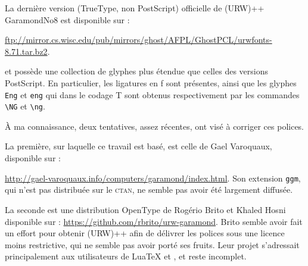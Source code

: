 \documentclass[12pt,english,french]{article}
\begin{document}
%
%

La dernière version (TrueType, non PostScript) officielle de (URW)++ GaramondNo8 est disponible sur :

\noindent\url{ftp://mirror.cs.wisc.edu/pub/mirrors/ghost/AFPL/GhostPCL/urwfonts-8.71.tar.bz2}.

\noindent et possède une collection de glyphes plus étendue que celles des versions PostScript. En particulier, les ligatures en f sont présentes, ainsi que les glyphes \texttt{Eng} et \texttt{eng} qui dans le codage T sont obtenus respectivement par les commandes \verb+\NG+ et \verb+\ng+.

%
%
%
%
%
%

À ma connaissance, deux tentatives, assez récentes, ont visé à corriger ces polices.%

La première, sur laquelle ce travail est basé, est celle de Gael Varoquaux, disponible sur :

\noindent\url{http://gael-varoquaux.info/computers/garamond/index.html}. Son extension \texttt{ggm}, qui n'est pas distribuée sur le \textsc{ctan}, ne semble pas avoir été largement diffusée.

La seconde est une distribution OpenType de Rogério Brito et Khaled Hosni disponible sur : \noindent\noindent\url{https://github.com/rbrito/urw-garamond}. Brito semble avoir fait un effort pour obtenir (URW)++ afin de délivrer les polices sous une licence moins restrictive, qui ne semble pas avoir porté ses fruits. Leur projet s'adressait principalement aux utilisateurs de Lua\TeX{} et \XeLaTeX, et reste incomplet.
\end{document}

